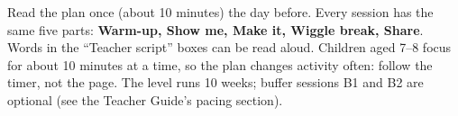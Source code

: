\documentclass[track=junior,level=1,teacher]{kidscode}
\begin{document}

\begin{tip}
Read the plan once (about 10 minutes) the day before. Every session has the same five parts:
\textbf{Warm-up, Show me, Make it, Wiggle break, Share}. Words in the \enquote{Teacher script}
boxes can be read aloud. Children aged 7--8 focus for about 10 minutes at a time, so the plan
changes activity often: follow the timer, not the page. The level runs 10 weeks; buffer
sessions B1 and B2 are optional (see the Teacher Guide's pacing section).
\end{tip}
\kcweeklytoc
{}
\end{document}
